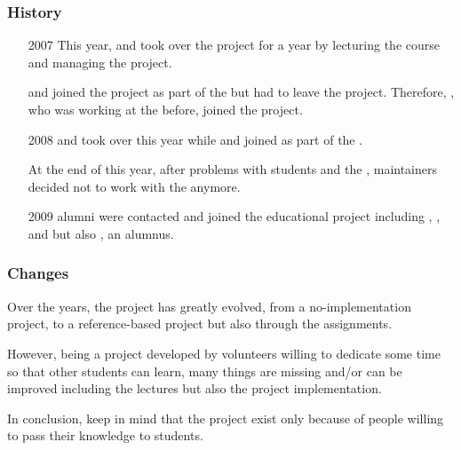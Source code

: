 \begin{frame}
  \frametitle{History}

  \begin{itemize}
    \item[2007]
      This year,  and  took
      over the project for a year by lecturing the course and managing the
      project.

      \-

       and  joined the project
      as part of the  but  had to leave the
      project. Therefore, , who was working at the
       before, joined the project.
    \item[2008]
       and  took over this year
      while  and  joined as part
      of the .

      \-

      At the end of this year, after problems with students and the ,
       maintainers decided not to work with the 
      anymore.
    \item[2009]
       alumni were contacted and joined the educational project
      including , ,
       and  but also
      , an  alumnus.
  \end{itemize}
\end{frame}


\begin{frame}
  \frametitle{Changes}

  Over the years, the project has greatly evolved, from a no-implementation
  project, to a reference-based project but also through the assignments.

  \-

  However, being a project developed by volunteers willing to dedicate some
  time so that other students can learn, many things are missing and/or
  can be improved including the lectures but also the project implementation.

  \-

  In conclusion, keep in mind that the project exist only because of people
  willing to pass their knowledge to students.
\end{frame}

